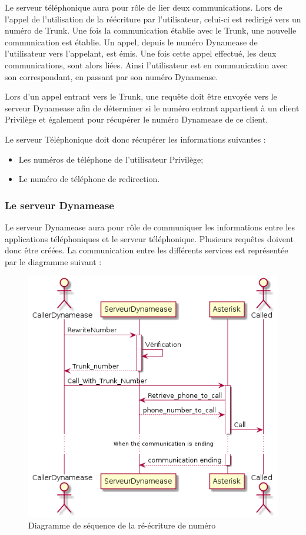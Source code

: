 Le serveur téléphonique aura pour rôle de lier deux communications. Lors de l'appel de l'utilisation de la réécriture par l'utilisateur, celui-ci est redirigé vers un numéro de Trunk. Une fois la communication établie avec le Trunk, une nouvelle communication est établie. Un appel, depuis le numéro Dynamease de l'utilisateur vers l'appelant, est émis. Une fois cette appel effectué, les deux communications, sont alors liées. Ainsi l'utilisateur est en communication avec son correspondant, en passant par son numéro Dynamease.

Lors d'un appel entrant vers le Trunk, une requête doit être envoyée vers le serveur Dynamease afin de déterminer si le numéro entrant appartient à un client Privilège et également pour récupérer le numéro Dynamease de ce client.

Le serveur Téléphonique doit donc récupérer les informations suivantes :

\begin{itemize}
	\item Les numéros de téléphone de l'utilisateur Privilège;
	\item Le numéro de téléphone de redirection.
\end{itemize}
 

\subsubsection{Le serveur Dynamease}

Le serveur Dynamease aura pour rôle de communiquer les informations entre les applications téléphoniques et le serveur téléphonique. Plusieurs requêtes doivent donc être créées. La communication entre les différents services est représentée par le diagramme suivant :\\

\begin{figure}[!h]
	\centering
	\includegraphics[scale=0.8]{img/sequence_rewirte.png}
	\caption{\label{sequence_rewirte} Diagramme de séquence de la ré-écriture de numéro}
\end{figure}

